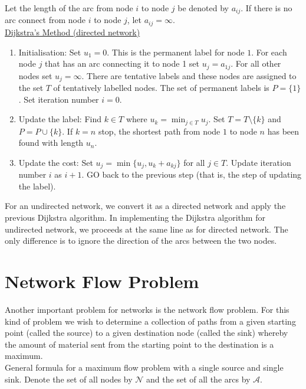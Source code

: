 Let the length of the arc from node \(i\) to node \(j\) be denoted by \(a_{ij}\). If there is no arc connect from node \(i\) to node \(j\), let \(a_{ij} = \infty\). \\

\underline{Dijkstra's Method (directed network)}
\begin{enumerate}
    \item Initialisation: Set \(u_1 = 0\). This is the permanent label for node \(1\). For each node \(j\) that has an arc connecting it to node 1 set \(u_j = a_{1j}\). For all other nodes set \(u_j = \infty\). There are tentative labels and these nodes are assigned to the set \(T\) of tentatively labelled nodes. The set of permanent labels is \(P = \{1\}\). Set iteration number \(i = 0\).
    \item Update the label: Find \(k \in T\) where \(u_k = \min_{j \in T} u_j\). Set \(T = T \setminus \{k\}\) and \(P = P \cup \{k\}\). If \(k = n\) stop, the shortest path from node \(1\) to node \(n\) has been found with length \(u_n\).
    \item Update the cost: Set \(u_j = \min\{u_j, u_k + a_{kj}\}\) for all \(j \in T\). Update iteration number \(i\) as \(i + 1\). GO back to the previous step (that is, the step of updating the label).
\end{enumerate}

For an undirected network, we convert it as a directed network and apply the previous Dijkstra algorithm. In implementing the Dijkstra algorithm for undirected network, we proceeds at the same line as for directed network. The only difference is to ignore the direction of the arcs between the two nodes.

\section{Network Flow Problem}

Another important problem for networks is the network flow problem. For this kind of problem we wish to determine a collection of paths from a given starting point (called the source) to a given destination node (called the sink) whereby the amount of material sent from the starting point to the destination is a maximum. \\

General formula for a maximum flow problem with a single source and single sink. Denote the set of all nodes by \(\mathcal{N}\) and the set of all the arcs by \(\mathcal{A}\).

